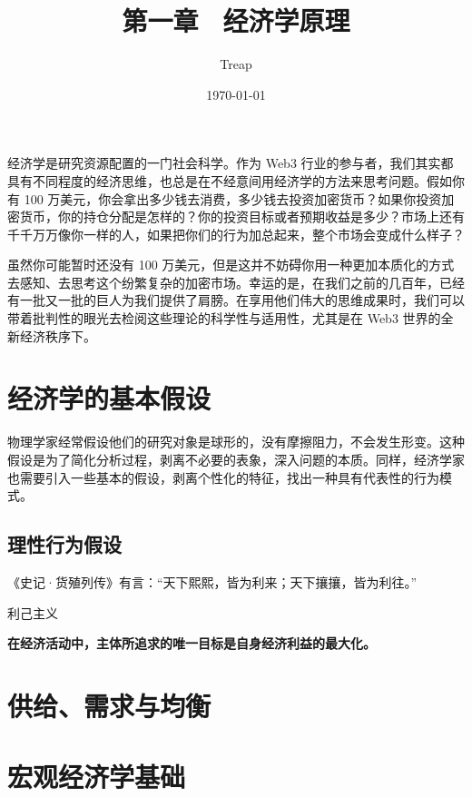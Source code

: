 \documentclass{article}
\begin{document}

\title{第一章 \ 经济学原理}
\author{Treap}
\date{\today}

\maketitle

经济学是研究资源配置的一门社会科学。作为 Web3 行业的参与者，我们其实都具有不同程度的经济思维，也总是在不经意间用经济学的方法来思考问题。假如你有 100 万美元，你会拿出多少钱去消费，多少钱去投资加密货币？如果你投资加密货币，你的持仓分配是怎样的？你的投资目标或者预期收益是多少？市场上还有千千万万像你一样的人，如果把你们的行为加总起来，整个市场会变成什么样子？

虽然你可能暂时还没有 100 万美元，但是这并不妨碍你用一种更加本质化的方式去感知、去思考这个纷繁复杂的加密市场。幸运的是，在我们之前的几百年，已经有一批又一批的巨人为我们提供了肩膀。在享用他们伟大的思维成果时，我们可以带着批判性的眼光去检阅这些理论的科学性与适用性，尤其是在 Web3 世界的全新经济秩序下。

\section{经济学的基本假设}

物理学家经常假设他们的研究对象是球形的，没有摩擦阻力，不会发生形变。这种假设是为了简化分析过程，剥离不必要的表象，深入问题的本质。同样，经济学家也需要引入一些基本的假设，剥离个性化的特征，找出一种具有代表性的行为模式。

\subsection{理性行为假设}

《史记·货殖列传》有言：“天下熙熙，皆为利来；天下攘攘，皆为利往。”

利己主义

\textbf{在经济活动中，主体所追求的唯一目标是自身经济利益的最大化。}

\section{供给、需求与均衡}

\section{宏观经济学基础}
\end{document}

